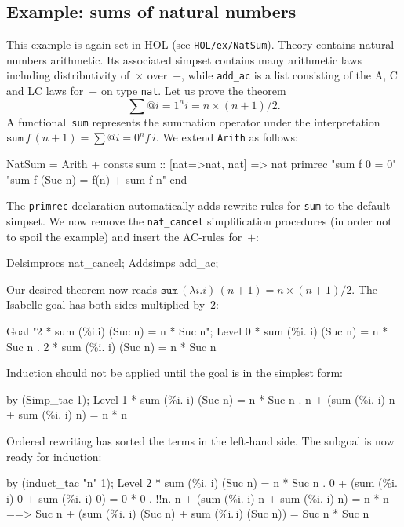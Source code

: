 \subsection{Example: sums of natural numbers}

This example is again set in HOL (see \texttt{HOL/ex/NatSum}).  Theory
 contains natural numbers arithmetic.  Its associated simpset
contains many arithmetic laws including distributivity of~$\times$ over~$+$,
while \texttt{add_ac} is a list consisting of the A, C and LC laws for~$+$ on
type \texttt{nat}.  Let us prove the theorem
\[ \sum@{i=1}^n i = n\times(n+1)/2. \]
%
A functional~\texttt{sum} represents the summation operator under the
interpretation $\texttt{sum} \, f \, (n + 1) = \sum@{i=0}^n f\,i$.  We
extend \texttt{Arith} as follows:
\begin{ttbox}
NatSum = Arith +
consts sum     :: [nat=>nat, nat] => nat
primrec 
  "sum f 0 = 0"
  "sum f (Suc n) = f(n) + sum f n"
end
\end{ttbox}
The \texttt{primrec} declaration automatically adds rewrite rules for
\texttt{sum} to the default simpset.  We now remove the
\texttt{nat_cancel} simplification procedures (in order not to spoil
the example) and insert the AC-rules for~$+$:
\begin{ttbox}
Delsimprocs nat_cancel;
Addsimps add_ac;
\end{ttbox}
Our desired theorem now reads $\texttt{sum} \, (\lambda i.i) \, (n+1) =
n\times(n+1)/2$.  The Isabelle goal has both sides multiplied by~$2$:
\begin{ttbox}
Goal "2 * sum (\%i.i) (Suc n) = n * Suc n";
{\out Level 0}
{ * sum (\%i. i) (Suc n) = n * Suc n}
{. 2 * sum (\%i. i) (Suc n) = n * Suc n}
\end{ttbox}
Induction should not be applied until the goal is in the simplest
form:
\begin{ttbox}
by (Simp_tac 1);
{\out Level 1}
{ * sum (\%i. i) (Suc n) = n * Suc n}
{. n + (sum (\%i. i) n + sum (\%i. i) n) = n * n}
\end{ttbox}
Ordered rewriting has sorted the terms in the left-hand side.  The
subgoal is now ready for induction:
\begin{ttbox}
by (induct_tac "n" 1);
{\out Level 2}
{ * sum (\%i. i) (Suc n) = n * Suc n}
{. 0 + (sum (\%i. i) 0 + sum (\%i. i) 0) = 0 * 0}
\ttbreak
{. !!n. n + (sum (\%i. i) n + sum (\%i. i) n) = n * n}
{\out           ==> Suc n + (sum (\%i. i) (Suc n) + sum (\%i.\,i) (Suc n)) =}
{\out               Suc n * Suc n}
\end{ttbox}
